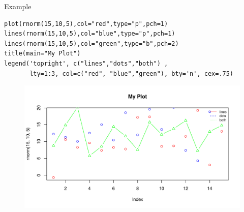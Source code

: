 \documentclass[handout]{beamer}
\begin{document}
\begin{frame}[fragile]{Example}
\scriptsize{
  \begin{verbatim}
plot(rnorm(15,10,5),col="red",type="p",pch=1)
lines(rnorm(15,10,5),col="blue",type="p",pch=1)
lines(rnorm(15,10,5),col="green",type="b",pch=2)
title(main="My Plot")
legend('topright', c("lines","dots","both") , 
       lty=1:3, col=c("red", "blue","green"), bty='n', cex=.75)
\end{verbatim}
  
  \begin{figure}[h!]
	\centering
	\includegraphics[scale=0.43]{pics/rplot.pdf}
	
	
\end{figure} 



 
} 
\end{frame}
\end{document}

